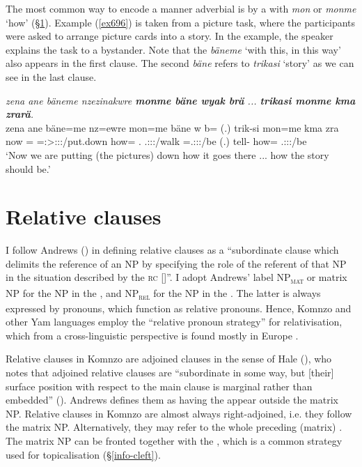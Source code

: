 The most common way to encode a manner adverbial is by a  with \emph{mon} or \emph{monme} `how' ({\S}\ref{relclauses}). Example (\ref{ex696}) is taken from a picture task, where the participants were asked to arrange picture cards into a story. In the example, the speaker explains the task to a bystander. Note that the  \emph{bäneme} `with this, in this way' also appears in the first clause. The second  \emph{bäne} refers to \emph{trikasi} `story' as we can see in the last clause.

\begin{exe}
	\ex \emph{zena ane bäneme nzezinakwre \textbf{monme bäne wyak brä} ... \textbf{trikasi monme kma zrarä}.}\\
	\gll zena ane bäne=me nz=ewre mon=me bäne w b= (.) trik-si mon=me kma zra\\
	now {\Dem} \Recog={\Ins} \Immpst=\Fpl:\Sbj>\Stpl:\Obj:\Nonpast:\Ipfv/put.down how={\Ins} \Recog.{\Abs} \Tsg.\F:\Sbj:\Nonpast:\Ipfv/walk \Med=\Tsg.\F:\Sbj:\Nonpast:\Ipfv/be (.) tell-{\Nmlz} how={\Ins} {\Pot} \Tsg.\F:\Sbj:\Irr:\Ipfv/be\\
	\trans `Now we are putting (the pictures) down how it goes there ... how the story should be.'
	\label{ex696}
\end{exe}

\section{Relative clauses}\label{relclauses}

I follow Andrews (\citeyear[206]{Andrews:2007relclauses}) in defining relative clauses as a ``subordinate clause which delimits the reference of an NP by specifying the role of the referent of that NP in the situation described by the \textsc{rc} []''. I adopt Andrews' label NP\textsubscript{\textsc{mat}} or matrix NP for the NP in the , and NP\textsubscript{\textsc{rel}} for the NP in the . The latter is always expressed by  pronouns, which function as relative pronouns. Hence, Komnzo and other Yam languages employ the ``relative pronoun strategy'' for relativisation, which from a cross-linguistic perspective is found mostly in Europe \citep{Haspelmath:2001}.

Relative clauses in Komnzo are adjoined clauses in the sense of Hale (\citeyear{Hale:1976adjoined}), who notes that adjoined relative clauses are ``subordinate in some way, but [their] surface position with respect to the main clause is marginal rather than embedded'' (\citeyear[78]{Hale:1976adjoined}). Andrews defines them as having the  appear outside the matrix NP. Relative clauses in Komnzo are almost always right-adjoined, i.e. they follow the matrix NP. Alternatively, they may refer to the whole preceding (matrix) . The matrix NP can be fronted together with the , which is a common strategy used for topicalisation ({\S}\ref{info-cleft}).

